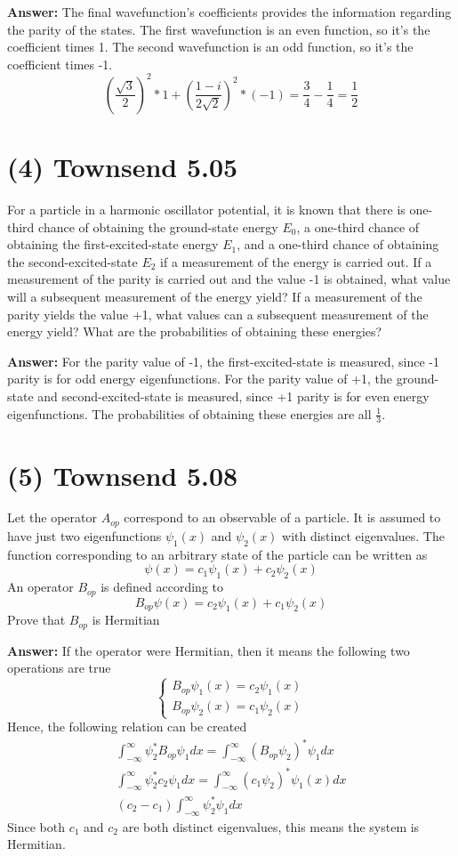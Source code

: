 \documentclass[10pt,letterpaper]{article}
\begin{document}
\textbf{Answer: }The final wavefunction's coefficients provides the information regarding the parity of the states. The first wavefunction is an even function, so it's the coefficient times 1. The second wavefunction is an odd function, so it's the coefficient times -1. 
$$\left( \frac{\sqrt{3}}{2} \right)^{2} * 1 + \left( \frac{1 - i}{2\sqrt{2}} \right)^{2} * (-1) = \frac{3}{4} - \frac{1}{4} = \frac{1}{2}$$

\section*{(4) Townsend 5.05}
For a particle in a harmonic oscillator potential, it is known that there is one-third chance of obtaining the ground-state energy $E_{0}$, a one-third chance of obtaining the first-excited-state energy $E_{1}$, and a one-third chance of obtaining the second-excited-state $E_{2}$ if a measurement of the energy is carried out. If a measurement of the parity is carried out and the value -1 is obtained, what value will a subsequent measurement of the energy yield? If a measurement of the parity yields the value +1, what values can a subsequent measurement of the energy yield? What are the probabilities of obtaining these energies?

\textbf{Answer: }For the parity value of -1, the first-excited-state is measured, since -1 parity is for odd energy eigenfunctions. For the parity value of +1, the ground-state and second-excited-state is measured, since +1 parity is for even energy eigenfunctions. The probabilities of obtaining these energies are all $\frac{1}{3}$. 

\section*{(5) Townsend 5.08}
Let the operator $A_{op}$ correspond to an observable of a particle. It is assumed to have just two eigenfunctions $\psi_{1}(x)$ and $\psi_{2}(x)$ with distinct eigenvalues. The function corresponding to an arbitrary state of the particle can be written as 
$$\psi(x) = c_{1}\psi_{1}(x) + c_{2}\psi_{2}(x)$$
An operator $B_{op}$ is defined according to 
$$B_{op}\psi(x) = c_{2}\psi_{1}(x) + c_{1}\psi_{2}(x)$$
Prove that $B_{op}$ is Hermitian

\textbf{Answer: }If the operator were Hermitian, then it means the following two operations are true
$$\begin{cases}
B_{op}\psi_{1}(x) = c_{2}\psi_{1}(x) \\
B_{op}\psi_{2}(x) = c_{1}\psi_{2}(x)
\end{cases}$$
Hence, the following relation can be created
\begin{gather*}
\int_{-\infty}^{\infty} \psi_{2}^{*} B_{op}\psi_{1}dx = \int_{-\infty}^{\infty} (B_{op} \psi_{2})^{*} \psi_{1}dx \\
\int_{-\infty}^{\infty} \psi_{2}^{*} c_{2} \psi_{1}dx = \int_{-\infty}^{\infty} (c_{1} \psi_{2})^{*} \psi_{1}(x)dx \\
(c_{2} - c_{1}) \int_{-\infty}^{\infty} \psi_{2}^{*} \psi_{1}dx
\end{gather*}
Since both $c_{1}$ and $c_{2}$ are both distinct eigenvalues, this means the system is Hermitian. 
\end{document}
